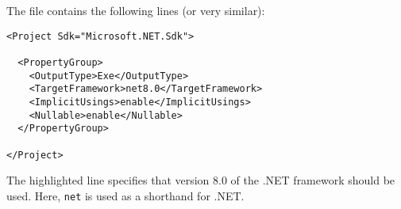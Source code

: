 The  file contains the following lines (or very similar):

\begin{verbatim}
<Project Sdk="Microsoft.NET.Sdk">

  <PropertyGroup>
    <OutputType>Exe</OutputType>
    <TargetFramework>net8.0</TargetFramework>
    <ImplicitUsings>enable</ImplicitUsings>
    <Nullable>enable</Nullable>
  </PropertyGroup>

</Project>
\end{verbatim}

The highlighted line specifies that version 8.0 of the .NET framework should be used. Here, \texttt{net} is used as a shorthand for .NET.

